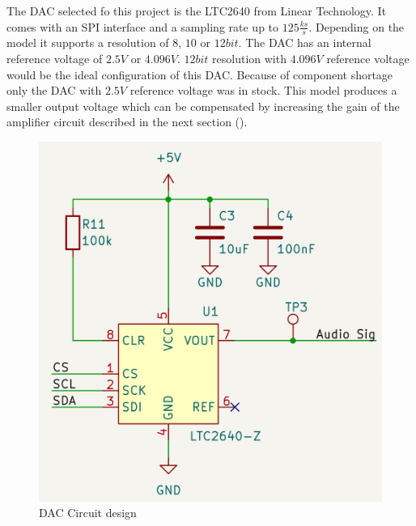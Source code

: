 %
The DAC selected fo this project is the LTC2640 from Linear Technology. It comes with an SPI interface and a sampling rate up to $125\frac{ks}{s}$. Depending on the model it supports a resolution of $8$, $10$ or $12bit$. The DAC has an internal reference voltage of $2.5V$ or $4.096V$. $12bit$ resolution with $4.096V$ reference voltage would be the ideal configuration of this DAC. Because of component shortage only the DAC with $2.5V$ reference voltage was in stock. This model produces a smaller output voltage which can be compensated by increasing the gain of the amplifier circuit described in the next section ().\cite{linear_technology_ltc2640_2017}
%
\begin{figure}
  \centering
  \includegraphics[height=\mediumheight]{src/assets/pictures/circuit/dac_circuit.png}
  \caption{DAC Circuit design}\label{fig:pcb:dac_circuit}
\end{figure}